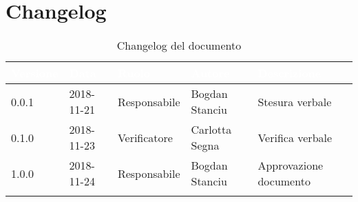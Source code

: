 \newpage

\section{Changelog}

\begin{center}
\begin{longtable}[c]{|m{}|m{}|m{}|m{}|p{}|}
\hline
\rowcolor{bluelogo}\textbf{\textcolor{white}{Versione}} & \textbf{\textcolor{white}{Data}} & \textbf{\textcolor{white}{Ruolo}} & \textbf{\textcolor{white}{Autore}} & \textbf{\textcolor{white}{Descrizione}}\\
\hline \hline
\endfirsthead
0.0.1 & 2018-11-21 & Responsabile &  Bogdan Stanciu & Stesura verbale \\
\hline
\rowcolor{grigio} 0.1.0 & 2018-11-23 & Verificatore & Carlotta Segna & Verifica verbale\\
\hline
1.0.0 & 2018-11-24 & Responsabile & Bogdan Stanciu & Approvazione documento\\ 
\hline

\caption{Changelog del documento}
\end{longtable}
\end{center}
